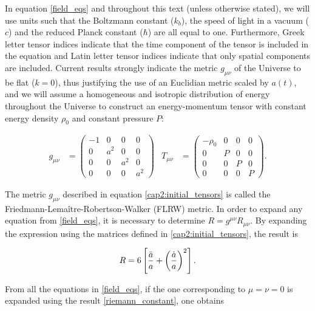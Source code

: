 \documentclass[openany,a4paper,12pt,oneside]{book}
\begin{document}
\begin{spacing}{1.5}
In equation \eqref{field_eqs} and throughout this text (unless otherwise stated), we will use units such that the Boltzmann constant ($k_b$), the speed of light in a vacuum ($c$) and the reduced Planck constant ($\hbar$) are all equal to one. Furthermore, Greek letter tensor indices indicate that the time component of the tensor is included in the equation and Latin letter tensor indices indicate that only spatial components are included. Current results strongly indicate the metric $g_{\mu\nu}$ of the Universe to be flat ($k=0$)\cite{Planck_results}, thus justifying the use of an Euclidian metric scaled by $a(t)$, and we will assume a homogeneous and isotropic distribution of energy throughout the Universe to construct an energy-momentum tensor with constant energy density $\rho_0$ and constant pressure $P$\cite{dodelson2020modern}:

\begin{align}\label{cap2:initial_tensors}
    g_{\mu\nu}&=
    \begin{pmatrix}
        -1 & 0 & 0 & 0\\
        0 & a^2 & 0 & 0\\
        0 & 0 & a^2 & 0\\
        0 & 0 & 0 & a^2
    \end{pmatrix} &
    T_{\mu\nu}&=
    \begin{pmatrix}
        -\rho_0 & 0 & 0 & 0 \\
        0 & P & 0 & 0 \\
        0 & 0 & P & 0 \\
        0 & 0 & 0 & P
    \end{pmatrix}.
\end{align}

The metric $g_{\mu\nu}$ described in equation \eqref{cap2:initial_tensors} is called the Friedmann-Lemaître-Robertson-Walker (FLRW) metric\cite{FLRW_metric}. In order to expand any equation from \eqref{field_eqs}, it is necessary to determine $R=g^{\mu\nu}R_{\mu\nu}$. By expanding the expression using the matrices defined in \eqref{cap2:initial_tensors}, the result is

\begin{equation}\label{riemann_constant}
    R=6\left[\frac{\Ddot{a}}{a}+\left(\frac{\dot{a}}{a}\right)^2\right].
\end{equation}

From all the equations in \eqref{field_eqs}, if the one corresponding to $\mu=\nu=0$ is expanded using the result \eqref{riemann_constant}, one obtains


\end{spacing}
\end{document}
